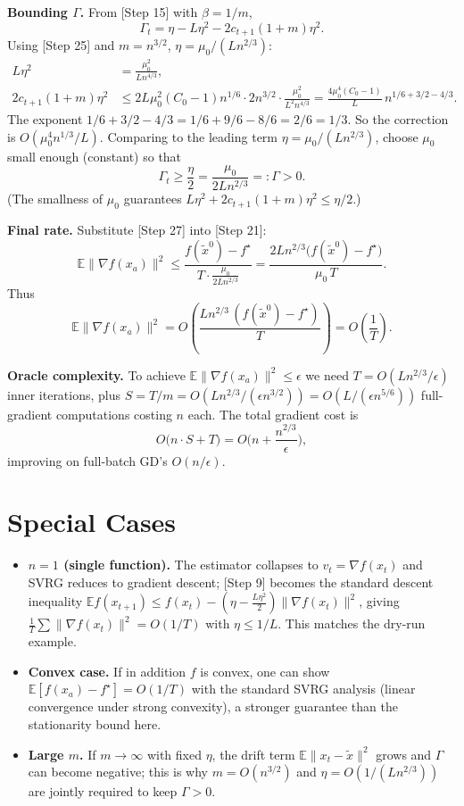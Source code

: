 \documentclass[11pt]{article}
\begin{document}
\textbf{Bounding $\Gamma$.}
From [Step 15] with $\beta=1/m$,
\[
\Gamma_t = \eta - L\eta^2 - 2c_{t+1}(1+m)\eta^2.
\tag*{[Step 26]}
\]
Using [Step 25] and $m=n^{3/2}$, $\eta=\mu_0/(Ln^{2/3})$:
\begin{align*}
L\eta^2 &= \frac{\mu_0^2}{L n^{4/3}},\\
2c_{t+1}(1+m)\eta^2 &\le 2 L\mu_0^2(C_0-1)n^{1/6}\cdot 2n^{3/2}\cdot \frac{\mu_0^2}{L^2 n^{4/3}}
= \frac{4\mu_0^4(C_0-1)}{L}\,n^{1/6+3/2-4/3}.
\end{align*}
The exponent $1/6+3/2-4/3 = 1/6+9/6-8/6 = 2/6 = 1/3$. So the correction is
$O(\mu_0^4 n^{1/3}/L)$. Comparing to the leading term
$\eta = \mu_0/(Ln^{2/3})$, choose $\mu_0$ small enough (constant) so that
\[
\Gamma_t \ge \frac{\eta}{2} = \frac{\mu_0}{2Ln^{2/3}} =: \Gamma > 0.
\tag*{[Step 27]}
\]
(The smallness of $\mu_0$ guarantees $L\eta^2 + 2c_{t+1}(1+m)\eta^2 \le \eta/2$.)

\textbf{Final rate.}
Substitute [Step 27] into [Step 21]:
\[
\mathbb{E}\|\nabla f(x_a)\|^2
\le \frac{f(\tilde{x}^0)-f^\star}{T\cdot \frac{\mu_0}{2Ln^{2/3}}}
= \frac{2Ln^{2/3}\big(f(\tilde{x}^0)-f^\star\big)}{\mu_0\,T}.
\tag*{[Step 28]}
\]
Thus
\[
\boxed{\;\mathbb{E}\|\nabla f(x_a)\|^2 = O\!\left(\frac{L n^{2/3}\,(f(\tilde{x}^0)-f^\star)}{T}\right) = O\!\left(\frac{1}{T}\right).\;}
\]

\textbf{Oracle complexity.}
To achieve $\mathbb{E}\|\nabla f(x_a)\|^2 \le \epsilon$ we need
$T = O(Ln^{2/3}/\epsilon)$ inner iterations, plus $S = T/m = O(Ln^{2/3}/(\epsilon n^{3/2})) = O(L/(\epsilon n^{5/6}))$
full-gradient computations costing $n$ each. The total gradient cost is
\[
O\!\big(n\cdot S + T\big) = O\!\Big(n + \frac{n^{2/3}}{\epsilon}\Big),
\]
improving on full-batch GD's $O(n/\epsilon)$.

\section*{Special Cases}

\begin{itemize}
\item \textbf{$n=1$ (single function).} The estimator collapses to $v_t=\nabla f(x_t)$ and
SVRG reduces to gradient descent; [Step 9] becomes the standard descent inequality
$\mathbb{E} f(x_{t+1}) \le f(x_t) - (\eta - \tfrac{L\eta^2}{2})\|\nabla f(x_t)\|^2$,
giving $\frac1T\sum\|\nabla f(x_t)\|^2 = O(1/T)$ with $\eta\le 1/L$. This matches the
dry-run example.

\item \textbf{Convex case.} If in addition $f$ is convex, one can show
$\mathbb{E}[f(x_a)-f^\star]=O(1/T)$ with the standard SVRG analysis (linear convergence
under strong convexity), a stronger guarantee than the stationarity bound here.

\item \textbf{Large $m$.} If $m\to\infty$ with fixed $\eta$, the drift term
$\mathbb{E}\|x_t-\tilde{x}\|^2$ grows and $\Gamma$ can become negative; this is why
$m=O(n^{3/2})$ and $\eta=O(1/(Ln^{2/3}))$ are jointly required to keep $\Gamma>0$.
\end{itemize}
\end{document}
